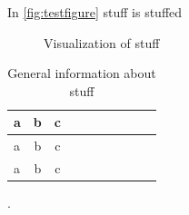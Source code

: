 In \autoref{fig:testfigure} stuff is stuffed

\begin{figure}[htbp]
    \centering

    \vspace{0.2cm}
    \caption{Visualization of stuff}
    \label{fig:testfigure}
\end{figure}

\begin{table}[htbp]
    \centering
    \begin{tabular}{l|cc|ccccccc} 
        \toprule
        a&b&c\\
        \midrule 
        a&b&c\\
        a&b&c\\
        \bottomrule
    \end{tabular}
    \vspace{0.5cm}
    \caption{General information about stuff}.
    \label{table:testtable}
\end{table}

